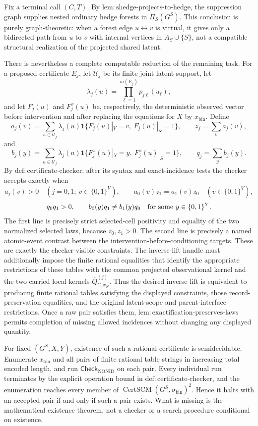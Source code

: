 Fix a terminal call \((C,T)\). By \(\mathrm{lem:shedge\text{-}projects\text{-}to\text{-}hedge}\), the suppression graph supplies nested ordinary hedge forests in \(\Pi_S(G^S)\). This conclusion is purely graph-theoretic: when a forest edge \(u\leftrightarrow v\) is virtual, it gives only a bidirected path from \(u\) to \(v\) with internal vertices in \(A_S\cup\{S\}\), not a compatible structural realization of the projected shared latent.

There is nevertheless a complete computable reduction of the remaining task. For a proposed certificate \(E_j\), let \(\mathcal U_j\) be its finite joint latent support, let
\[
 \lambda_j(u)=\prod_{\ell=1}^{m(E_j)}p_{j\ell}(u_\ell),
\]
and let \(F_j(u)\) and \(F^{x}_{j}(u)\) be, respectively, the deterministic observed vector before intervention and after replacing the equations for \(X\) by \(x_{\mathrm{bin}}\). Define
\[
 a_j(v)=\sum_{u\in\mathcal U_j}\lambda_j(u)
 \mathbf 1\{F_j(u)|_V=v,\ F_j(u)|_S=1\},
 \qquad z_j=\sum_v a_j(v),
\]
and
\[
 b_j(y)=\sum_{u\in\mathcal U_j}\lambda_j(u)
 \mathbf 1\{F^x_j(u)|_Y=y,\ F^x_j(u)|_S=1\},
 \qquad q_j=\sum_y b_j(y).
\]
By \(\mathrm{def:certificate\text{-}checker}\), after its syntax and exact-incidence tests the checker accepts exactly when
\[
 a_j(v)>0\quad(j=0,1;\ v\in\{0,1\}^V),
 \qquad a_0(v)z_1=a_1(v)z_0\quad(v\in\{0,1\}^V),
\]
\[
 q_0q_1>0,
 \qquad b_0(y)q_1\ne b_1(y)q_0
 \quad\hbox{for some }y\in\{0,1\}^Y.
\]
The first line is precisely strict selected-cell positivity and equality of the two normalized selected laws, because \(z_0,z_1>0\). The second line is precisely a named atomic-event contrast between the intervention-before-conditioning targets. These are exactly the checker-visible constraints. The inverse-lift handle must additionally impose the finite rational equalities that identify the appropriate restrictions of these tables with the common projected observational kernel and the two carried local kernels \(\overline Q^{(j)}_{C,x_N}\). Thus the desired inverse lift is equivalent to producing finite rational tables satisfying the displayed constraints, those record-preservation equalities, and the original latent-scope and parent-interface restrictions. Once a raw pair satisfies them, \(\mathrm{lem:exactification\text{-}preserves\text{-}laws}\) permits completion of missing allowed incidences without changing any displayed quantity.

For fixed \((G^S,X,Y)\), existence of such a rational certificate is semidecidable. Enumerate \(x_{\mathrm{bin}}\) and all pairs of finite rational table strings in increasing total encoded length, and run \(\mathsf{Check}_{\mathrm{NONID}}\) on each pair. Every individual run terminates by the explicit operation bound in \(\mathrm{def:certificate\text{-}checker}\), and the enumeration reaches every member of \(\operatorname{CertSCM}(G^S,\sigma_{\mathrm{bin}})^2\). Hence it halts with an accepted pair if and only if such a pair exists. What is missing is the mathematical existence theorem, not a checker or a search procedure conditional on existence.

